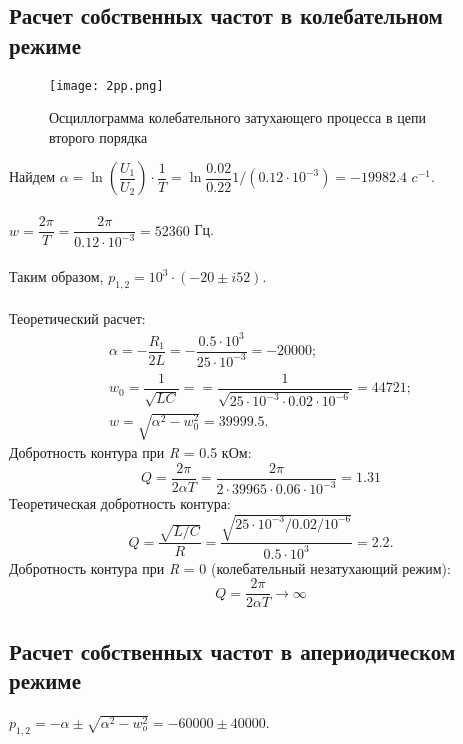 \documentclass[a4paper,14pt ]{article} %
\begin{document}
\subsection{Расчет собственных частот в колебательном режиме} 
\begin{figure}[H]
    \centering
    \texttt{[image: 2pp.png]}
    \caption{\centering Осциллограмма колебательного затухающего процесса в цепи второго порядка}
\end{figure}
Найдем $\alpha = \ln\left(\dfrac{U_1}{U_2}\right)\cdot\dfrac1T = \ln\dfrac{0.02}{0.22}
1/(0.12\cdot10^{-3}) = -19982.4 \,\, c^{-1}
$.
\\\\
 $w = \dfrac{2\pi}{T} = \dfrac{2\pi}{0.12\cdot10^{-3}} = 52360$ Гц.
\\\\
\indent Таким образом, $p_{1,2} = 10^3\cdot(-20 \pm i52)$.
\\\\ 
\indent Теоретический расчет: 
\begin{multline*}
    \alpha = -\dfrac{R_1}{2L} 
= -\dfrac{0.5\cdot10^3}{25\cdot10^{-3}} = -20000;\\ 
w_0 =\dfrac1{\sqrt{LC}} = 
= \dfrac{1}{\sqrt{25\cdot10^{-3}\cdot0.02\cdot10^{-6}}} =  44721; \\w = 
\sqrt{\alpha^2 - w_0^2} = 39999.5. 
\end{multline*}
\indent Добротность контура при {\it R} = 0.5 кОм:
\begin{equation*}
    Q=\frac{2\pi}{2\alpha T} = \frac{2\pi}{2\cdot39965\cdot 0.06 \cdot 10^{-3}}=
    1.31
\end{equation*}
\indent Теоретическая добротность контура: 
\begin{equation*}
    Q = \frac{\sqrt{L/C}}{R} = \dfrac{\sqrt{25\cdot10^{-3}/0.02/10^{-6}}}{0.5\cdot10^3} = 2.2.
\end{equation*}
\indent Добротность контура при {\it R} = 0 (колебательный незатухающий режим):
\begin{equation*}
    Q = \frac{2\pi}{2\alpha T} \to \infty
\end{equation*}
\subsection{Расчет собственных частот в апериодическом режиме}
$p_{1,2} = -\alpha \pm \sqrt{\alpha^2 - w_o^2} = -60000 \pm 40000$. 
\end{document}

